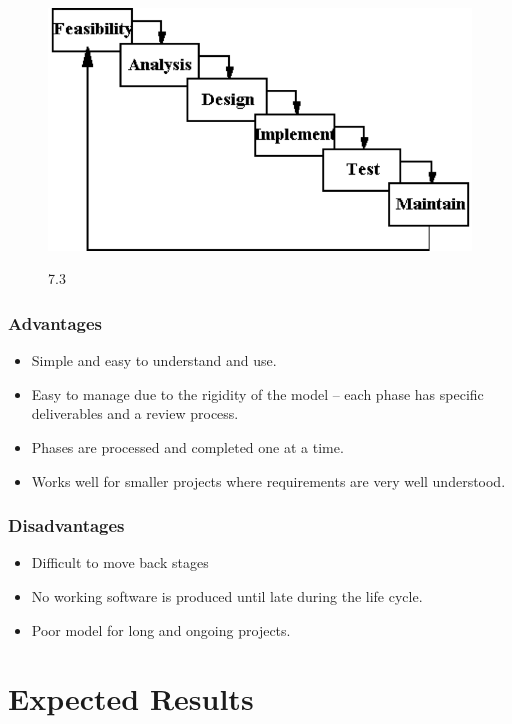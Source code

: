\documentclass[]{report}
\begin{document}
		\begin{figure}[!htb]
			\includegraphics[width=.8\textwidth]{img3.png}
			\begin{center}
				\figurename{ 7.3}
			\end{center}
		\end{figure}
			
	\subsubsection{Advantages}
	\begin{itemize}
		\item Simple and easy to understand and use.
		\item Easy to manage due to the rigidity of the model – each phase has specific deliverables and a review process.
		\item Phases are processed and completed one at a time.
		\item Works well for smaller projects where requirements are very well understood.
	\end{itemize}
	
	\subsubsection{Disadvantages}
	\begin{itemize}
		\item Difficult to move back stages
		\item No working software is produced until late during the life cycle.
		\item Poor model for long and ongoing projects.
	\end{itemize}

\newpage

\section{Expected Results}
\end{document}

